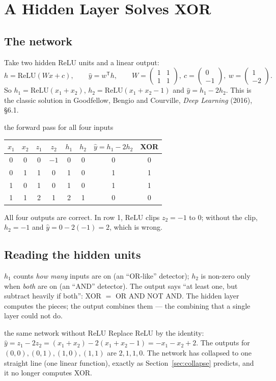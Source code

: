 \documentclass[11pt]{article}
\begin{document}
\section{A Hidden Layer Solves XOR}
\subsection{The network}
Take two hidden ReLU units and a linear output:
\[h=\text{ReLU}(Wx+c),\qquad\hat y=w^{\mathsf T}h,\qquad W=\begin{pmatrix}1&1\\1&1\end{pmatrix},\ c=\begin{pmatrix}0\\-1\end{pmatrix},\ w=\begin{pmatrix}1\\-2\end{pmatrix}.\]
So $h_1=\text{ReLU}(x_1+x_2)$, $h_2=\text{ReLU}(x_1+x_2-1)$ and $\hat y=h_1-2h_2$. This is the classic solution in Goodfellow, Bengio and Courville, \emph{Deep Learning} (2016), \S6.1.
\begin{example}{the forward pass for all four inputs}
\begin{center}\small\renewcommand{\arraystretch}{1.25}
\begin{tabular}{cc|cc|cc|c|c}\toprule
$x_1$&$x_2$&$z_1$&$z_2$&$h_1$&$h_2$&$\hat y=h_1-2h_2$&XOR\\\midrule
0&0&0&$-1$&0&0&0&0\\
0&1&1&0&1&0&1&1\\
1&0&1&0&1&0&1&1\\
1&1&2&1&2&1&0&0\\\bottomrule
\end{tabular}\end{center}
All four outputs are correct. In row 1, ReLU clips $z_2=-1$ to 0; without the clip, $h_2=-1$ and $\hat y=0-2(-1)=2$, which is wrong.
\end{example}
\subsection{Reading the hidden units}
$h_1$ counts \emph{how many} inputs are on (an ``OR-like'' detector); $h_2$ is non-zero only when \emph{both} are on (an ``AND'' detector). The output says ``at least one, but subtract heavily if both'': XOR $=$ OR AND NOT AND. The hidden layer computes the pieces; the output combines them --- the combining that a single layer could not do.
\begin{example}{the same network without ReLU}
Replace ReLU by the identity: $\hat y=z_1-2z_2=(x_1+x_2)-2(x_1+x_2-1)=-x_1-x_2+2$. The outputs for $(0,0),(0,1),(1,0),(1,1)$ are $2,1,1,0$. The network has collapsed to one straight line (one linear function), exactly as Section~\ref{sec:collapse} predicts, and it no longer computes XOR.
\end{example}
\end{document}
